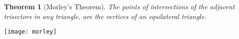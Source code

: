 \documentclass[12pt]{article}
\newtheorem{thm}{Theorem}
\begin{document}
\begin{thm}[Morley's Theorem]
The points of intersections of the adjacent trisectors in any triangle, are the vertices of an equilateral triangle.
\end{thm}

\begin{center}\texttt{[image: morley]}\end{center}
\end{document}
